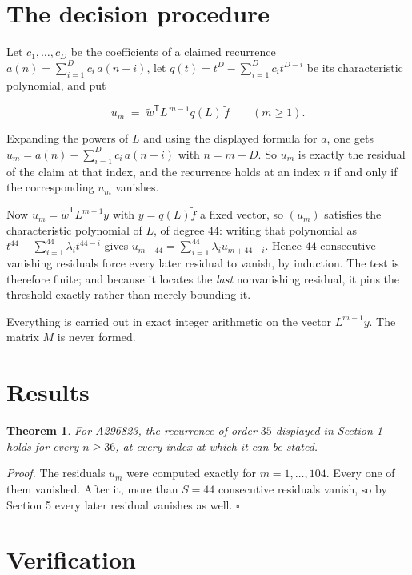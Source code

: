 \documentclass[11pt]{article}
\newtheorem{theorem}{Theorem}
\theoremstyle{definition}
\begin{document}
\section{The decision procedure}

Let $c_1,\dots,c_D$ be the coefficients of a claimed recurrence $a(n) = \sum_{i=1}^{D} c_i\,a(n-i)$, let $q(t) = t^{D} - \sum_{i=1}^{D} c_i t^{D-i}$ be its characteristic polynomial, and put

\[u_m \;=\; \tilde w^{\mathsf T} L^{\,m-1} q(L)\,\tilde f \qquad (m \ge 1).\]

Expanding the powers of $L$ and using the displayed formula for $a$, one gets $u_m = a(n) - \sum_{i=1}^{D} c_i\,a(n-i)$ with $n = m + D$. So $u_m$ is exactly the residual of the claim at that index, and the recurrence holds at an index $n$ if and only if the corresponding $u_m$ vanishes.

Now $u_m = \tilde w^{\mathsf T} L^{m-1} y$ with $y = q(L)\tilde f$ a fixed vector, so $(u_m)$ satisfies the characteristic polynomial of $L$, of degree $44$: writing that polynomial as $t^{44} - \sum_{i=1}^{44} \lambda_i t^{44-i}$ gives $u_{m+44} = \sum_{i=1}^{44} \lambda_i u_{m+44-i}$. Hence $44$ consecutive vanishing residuals force every later residual to vanish, by induction. The test is therefore finite; and because it locates the {\itshape last} nonvanishing residual, it pins the threshold exactly rather than merely bounding it.

Everything is carried out in exact integer arithmetic on the vector $L^{m-1}y$. The matrix $M$ is never formed.

\section{Results}

\begin{theorem} For A296823, the recurrence of order $35$ displayed in Section 1 holds for every $n \ge 36$, at every index at which it can be stated.\end{theorem}

{\itshape Proof.} The residuals $u_m$ were computed exactly for $m = 1,\dots,104$. Every one of them vanished. After it, more than $S = 44$ consecutive residuals vanish, so by Section 5 every later residual vanishes as well. $\square$

\section{Verification}
\end{document}
